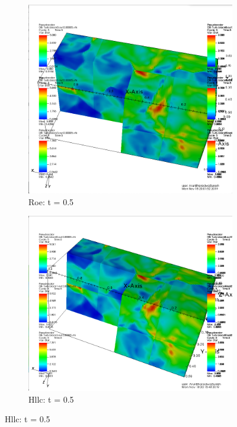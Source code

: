 \documentclass[12pt]{article}
\begin{document}
\begin{figure}[h]
	\centering
	\begin{subfigure}[h]{0.4500\textwidth}
		\centering
		\includegraphics[width=\textwidth]{roet5.png}
		\caption{Roe: t = 0.5}
	\end{subfigure}
	\begin{subfigure}[h]{0.4500\textwidth}
		\centering
		\includegraphics[width=\textwidth]{hllct5.png}
		\caption{Hllc: t = 0.5}
	\end{subfigure}
\end{figure}
\end{document}
